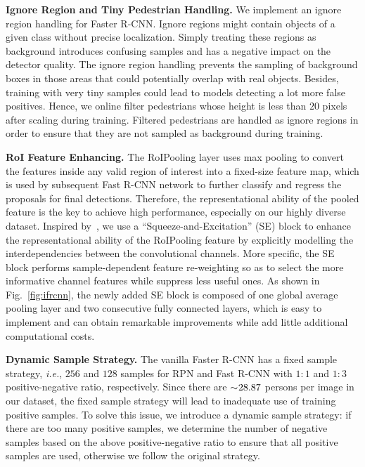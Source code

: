 \documentclass[journal]{IEEEtran}
\def\ie{{\em i.e.}}
\begin{document}
{\flushleft \textbf{Ignore Region and Tiny Pedestrian Handling.}}
We implement an ignore region handling for Faster R-CNN. Ignore regions might contain objects of a given class without precise localization. Simply treating these regions as background introduces confusing samples and has a negative impact on the detector quality. The ignore region handling prevents the sampling of background boxes in those areas that could potentially overlap with real objects. Besides, training with very tiny samples could lead to models detecting a lot more false positives. Hence, we online filter pedestrians whose height is less than $20$ pixels after scaling during training. Filtered pedestrians are handled as ignore regions in order to ensure that they are not sampled as background during training.

{\flushleft \textbf{RoI Feature Enhancing.}}
The RoIPooling layer uses max pooling to convert the features inside any valid region of interest into a fixed-size feature map, which is used by subsequent Fast R-CNN network to further classify and regress the proposals for final detections. Therefore, the representational ability of the pooled feature is the key to achieve high performance, especially on our highly diverse dataset. Inspired by~\cite{DBLP:journals/corr/abs-1709-01507, DBLP:conf/cvpr/ZhangYS18}, we use a ``Squeeze-and-Excitation'' (SE) block to enhance the representational ability of the RoIPooling feature by explicitly modelling the interdependencies between the convolutional channels. More specific, the SE block performs sample-dependent feature re-weighting so as to select the more informative channel features while suppress less useful ones. As shown in Fig.~\ref{fig:ifrcnn}, the newly added SE block is composed of one global average pooling layer and two consecutive fully connected layers, which is easy to implement and can obtain remarkable improvements while add little additional computational costs.

{\flushleft \textbf{Dynamic Sample Strategy.}}
The vanilla Faster R-CNN has a fixed sample strategy, \ie, $256$ and $128$ samples for RPN and Fast R-CNN with $1:1$ and $1:3$ positive-negative ratio, respectively. Since there are $\sim\negmedspace 28.87$ persons per image in our dataset, the fixed sample strategy will lead to inadequate use of training positive samples. To solve this issue, we introduce a dynamic sample strategy: if there are too many positive samples, we determine the number of negative samples based on the above positive-negative ratio to ensure that all positive samples are used, otherwise we follow the original strategy.
\end{document}
